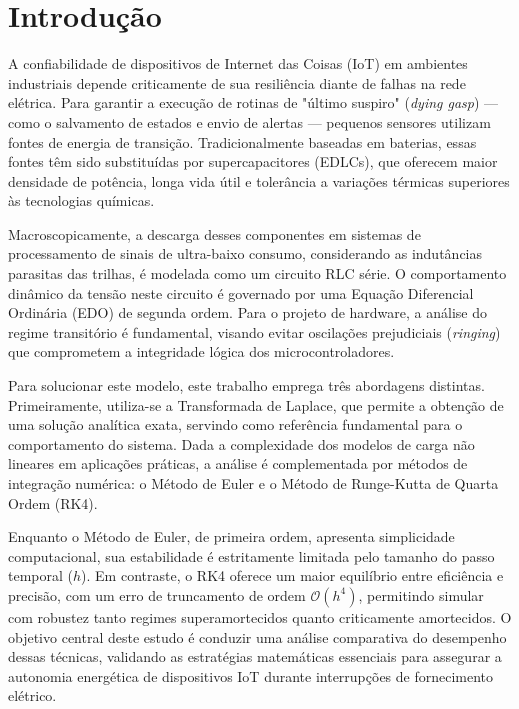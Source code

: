 \documentclass[12pt, a4paper]{article}
\begin{document}
\vspace{0.8cm}


\section*{Introdução}
A confiabilidade de dispositivos de Internet das Coisas (IoT) em ambientes industriais depende criticamente de sua resiliência diante de falhas na rede elétrica. Para garantir a execução de rotinas de "último suspiro" (\textit{dying gasp}) — como o salvamento de estados e envio de alertas — pequenos sensores utilizam fontes de energia de transição. Tradicionalmente baseadas em baterias, essas fontes têm sido substituídas por supercapacitores (EDLCs), que oferecem maior densidade de potência, longa vida útil e tolerância a variações térmicas superiores às tecnologias químicas.

Macroscopicamente, a descarga desses componentes em sistemas de processamento de sinais de ultra-baixo consumo, considerando as indutâncias parasitas das trilhas, é modelada como um circuito RLC série. O comportamento dinâmico da tensão neste circuito é governado por uma Equação Diferencial Ordinária (EDO) de segunda ordem. Para o projeto de hardware, a análise do regime transitório é fundamental, visando evitar oscilações prejudiciais (\textit{ringing}) que comprometem a integridade lógica dos microcontroladores.

Para solucionar este modelo, este trabalho emprega três abordagens distintas. Primeiramente, utiliza-se a Transformada de Laplace, que permite a obtenção de uma solução analítica exata, servindo como referência fundamental para o comportamento do sistema. Dada a complexidade dos modelos de carga não lineares em aplicações práticas, a análise é complementada por métodos de integração numérica: o Método de Euler e o Método de Runge-Kutta de Quarta Ordem (RK4).

Enquanto o Método de Euler, de primeira ordem, apresenta simplicidade computacional, sua estabilidade é estritamente limitada pelo tamanho do passo temporal ($h$). Em contraste, o RK4 oferece um maior equilíbrio entre eficiência e precisão, com um erro de truncamento de ordem $\mathcal{O}(h^4)$, permitindo simular com robustez tanto regimes superamortecidos quanto criticamente amortecidos. O objetivo central deste estudo é conduzir uma análise comparativa do desempenho dessas técnicas, validando as estratégias matemáticas essenciais para assegurar a autonomia energética de dispositivos IoT durante interrupções de fornecimento elétrico.
\end{document}
